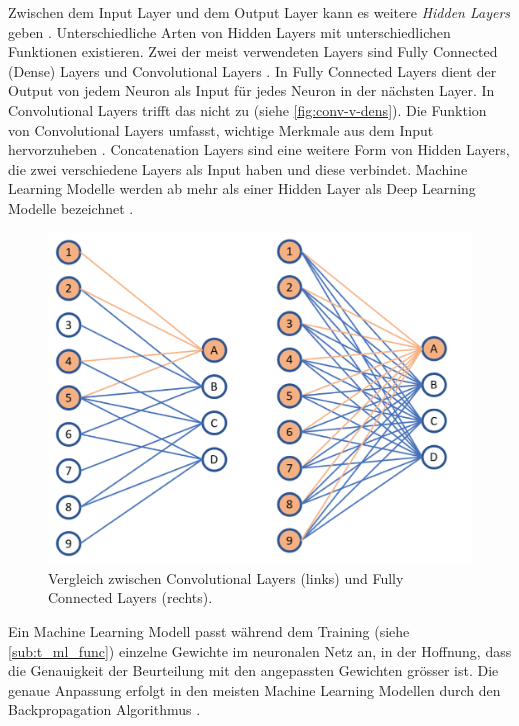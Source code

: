 Zwischen dem Input Layer und dem Output Layer kann es weitere \emph{Hidden
Layers} geben \cite{malik_what_2019}. Unterschiedliche Arten von Hidden Layers
mit unterschiedlichen Funktionen existieren. Zwei der meist verwendeten Layers
sind Fully Connected (Dense) Layers und Convolutional Layers
\cite{unzueta_convolutional_2022}. In Fully Connected Layers dient der Output
von jedem Neuron als Input für jedes Neuron in der nächsten Layer. In
Convolutional Layers trifft das nicht zu (siehe \autoref{fig:conv-v-dens}). Die
Funktion von Convolutional Layers umfasst, wichtige Merkmale aus dem Input
hervorzuheben \cite{oshea_introduction_2015}. Concatenation Layers
\cite{jayawardana_concatenating_2021} sind eine weitere Form von Hidden Layers,
die zwei verschiedene Layers als Input haben und diese verbindet. Machine
Learning Modelle werden ab mehr als einer Hidden Layer als Deep Learning Modelle
bezeichnet \cite{kranz_deep_2019}.
 
\begin{figure}[!ht]
   \centering
   \includegraphics[width=\textwidth-4cm]{images/theorie/conv-v-dens.png}
   \caption{Vergleich zwischen Convolutional Layers (links) und Fully Connected Layers (rechts). \cite{unzueta_convolutional_2022}}\label{fig:conv-v-dens}
\end{figure}
 
Ein Machine Learning Modell passt während dem Training (siehe
\ref{sub:t_ml_func}) einzelne Gewichte im neuronalen Netz an, in der Hoffnung,
dass die Genauigkeit der Beurteilung mit den angepassten Gewichten grösser ist.
Die genaue Anpassung erfolgt in den meisten Machine Learning Modellen durch den
Backpropagation Algorithmus \cite{rumelhart_learning_1985}.

